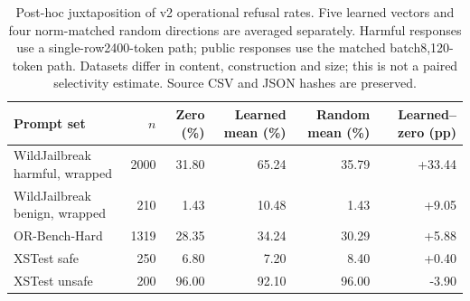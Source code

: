 \begin{table}[t]
\centering\small
\begin{tabular}{lrrrrr}
\toprule
Prompt set & $n$ & Zero (\%) & Learned mean (\%) & Random mean (\%) & Learned--zero (pp) \\
\midrule
WildJailbreak harmful, wrapped & 2000 & 31.80 & 65.24 & 35.79 & +33.44 \\
WildJailbreak benign, wrapped & 210 & 1.43 & 10.48 & 1.43 & +9.05 \\
OR-Bench-Hard & 1319 & 28.35 & 34.24 & 30.29 & +5.88 \\
XSTest safe & 250 & 6.80 & 7.20 & 8.40 & +0.40 \\
XSTest unsafe & 200 & 96.00 & 92.10 & 96.00 & -3.90 \\
\bottomrule
\end{tabular}
\caption{Post-hoc juxtaposition of v2 operational refusal rates. Five learned vectors and four norm-matched random directions are averaged separately. Harmful responses use a single-row2400-token path; public responses use the matched batch8,120-token path. Datasets differ in content, construction and size; this is not a paired selectivity estimate. Source CSV and JSON hashes are preserved.}
\label{tab:benefit-cost-posthoc}
\end{table}
